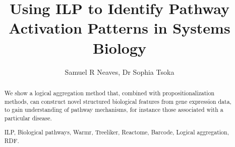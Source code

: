 \documentclass[runningheads,a4paper]{llncs}
\newcommand{\keywords}[1]{\par\addvspace\baselineskip
\noindent\keywordname\enspace\ignorespaces#1}
\begin{document}
\mainmatter  %

%
\title{Using ILP to Identify Pathway Activation Patterns in Systems Biology}

%
%
\author{Samuel R Neaves, Dr Sophia Tsoka}
%


%
%

\maketitle


\begin{abstract}
We show a logical aggregation method that, combined with propositionalization methods, can construct novel structured biological features from gene expression data, to gain understanding of pathway mechanisms, for instance those associated with a particular disease. 

\keywords{ILP, Biological pathways, Warmr, Treeliker, Reactome, Barcode, Logical aggregation, RDF.}
\end{abstract}
\end{document}
